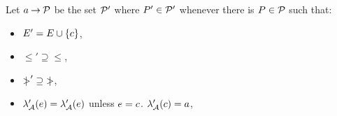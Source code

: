 

\begin{definition}
  \label{def:prefix}
Let $a \mathbin\rightarrow \mathcal{P}$ be the set $\mathcal{P}'$ where $P'\in\mathcal{P}'$ whenever
there is $P\in\mathcal{P}$ such that:
\begin{itemize}
\item $E' = E \cup \{c\}$,
\item ${\le'}\supseteq{\le}$, %
\item ${\mathrel{\mkern4mu\mid\!\!\!>}'}\supseteq{\mathrel{\mkern4mu\mid\!\!\!>}}$, %
\item $\lambda_{\mathcal{A}}'(e) = \lambda_{\mathcal{A}}'(e)$ unless $e=c$.   $\lambda_{\mathcal{A}}'(c) = a$, 

\end{itemize}
\end{definition}
